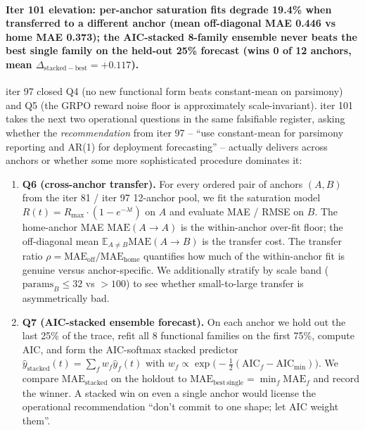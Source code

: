\paragraph{Iter 101 elevation: per-anchor saturation fits degrade 19.4\% when transferred to a different anchor (mean off-diagonal MAE 0.446 vs home MAE 0.373); the AIC-stacked 8-family ensemble never beats the best single family on the held-out 25\% forecast (wins 0 of 12 anchors, mean $\Delta_\mathrm{stacked-best} = +0.117$).}
\label{par:scaling-iter101}

iter 97 closed Q4 (no new functional form beats constant-mean on
parsimony) and Q5 (the GRPO reward noise floor is approximately
scale-invariant).  iter 101 takes the next two operational questions
in the same falsifiable register, asking whether the
\emph{recommendation} from iter 97 -- ``use constant-mean for parsimony
reporting and AR(1) for deployment forecasting'' -- actually delivers
across anchors or whether some more sophisticated procedure dominates
it:

\begin{enumerate}
\item \textbf{Q6 (cross-anchor transfer).}  For every ordered pair of
anchors $(A, B)$ from the iter 81 / iter 97 12-anchor pool, we fit
the saturation model $R(t) = R_\mathrm{max} \cdot (1 - e^{-\lambda t})$
on $A$ and evaluate MAE / RMSE on $B$.  The home-anchor MAE
$\mathrm{MAE}(A \to A)$ is the within-anchor over-fit floor; the
off-diagonal mean $\mathbb{E}_{A \ne B} \mathrm{MAE}(A \to B)$ is the
transfer cost.  The transfer ratio
$\rho = \mathrm{MAE}_\mathrm{off} / \mathrm{MAE}_\mathrm{home}$
quantifies how much of the within-anchor fit is genuine versus
anchor-specific.  We additionally stratify by scale band
($\mathrm{params}_B \le 32$ vs $> 100$) to see whether small-to-large
transfer is asymmetrically bad.
\item \textbf{Q7 (AIC-stacked ensemble forecast).}  On each anchor we
hold out the last 25\% of the trace, refit all 8 functional families
on the first 75\%, compute AIC, and form the AIC-softmax stacked
predictor
$\hat y_\mathrm{stacked}(t) = \sum_f w_f \hat y_f(t)$ with
$w_f \propto \exp\!\bigl(-\tfrac{1}{2}(\mathrm{AIC}_f -
\mathrm{AIC}_\mathrm{min})\bigr)$.
We compare $\mathrm{MAE}_\mathrm{stacked}$ on the holdout to
$\mathrm{MAE}_\mathrm{best\,single} = \min_f \mathrm{MAE}_f$ and
record the winner.  A stacked win on even a single anchor would
license the operational recommendation ``don't commit to one shape;
let AIC weight them''.
\end{enumerate}

